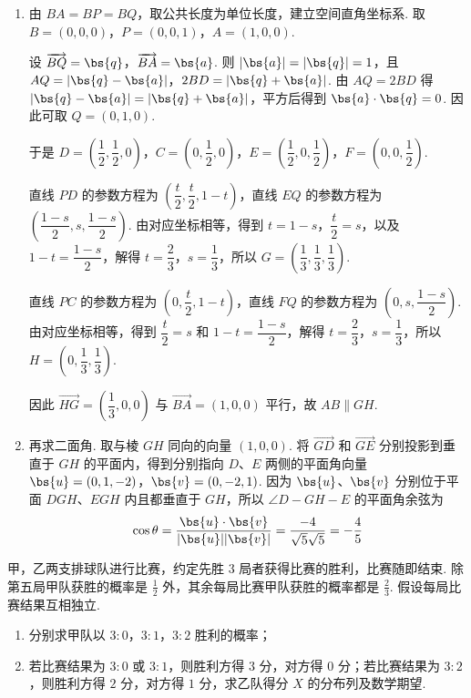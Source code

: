 \FloatBarrier

\begin{solution}
\begin{enumerate}
\item
由 \(BA=BP=BQ\)，取公共长度为单位长度，建立空间直角坐标系. 取 \(B=(0,0,0)\)，\(P=(0,0,1)\)，\(A=(1,0,0)\).

设 \(\overrightarrow{BQ}=\bs{q}\)，\(\overrightarrow{BA}=\bs{a}\). 则 \(|\bs{a}|=|\bs{q}|=1\)，且 \(AQ=|\bs{q}-\bs{a}|\)，\(2BD=|\bs{q}+\bs{a}|\). 由 \(AQ=2BD\) 得 \(|\bs{q}-\bs{a}|=|\bs{q}+\bs{a}|\)，平方后得到 \(\bs{a}\cdot\bs{q}=0\). 因此可取 \(Q=(0,1,0)\).

于是 \(D=\left(\dfrac12,\dfrac12,0\right)\)，\(C=\left(0,\dfrac12,0\right)\)，\(E=\left(\dfrac12,0,\dfrac12\right)\)，\(F=\left(0,0,\dfrac12\right)\).

直线 \(PD\) 的参数方程为 \(\left(\dfrac t2,\dfrac t2,1-t\right)\)，直线 \(EQ\) 的参数方程为 \(\left(\dfrac{1-s}{2},s,\dfrac{1-s}{2}\right)\). 由对应坐标相等，得到 \(t=1-s\)，\(\dfrac t2=s\)，以及 \(1-t=\dfrac{1-s}{2}\)，解得 \(t=\dfrac23\)，\(s=\dfrac13\)，所以 \(G=\left(\dfrac13,\dfrac13,\dfrac13\right)\).

直线 \(PC\) 的参数方程为 \(\left(0,\dfrac t2,1-t\right)\)，直线 \(FQ\) 的参数方程为 \(\left(0,s,\dfrac{1-s}{2}\right)\). 由对应坐标相等，得到 \(\dfrac t2=s\) 和 \(1-t=\dfrac{1-s}{2}\)，解得 \(t=\dfrac23\)，\(s=\dfrac13\)，所以 \(H=\left(0,\dfrac13,\dfrac13\right)\).

因此 \(\overrightarrow{HG}=\left(\dfrac13,0,0\right)\) 与 \(\overrightarrow{BA}=(1,0,0)\) 平行，故 \(AB\parallel GH\).

\item
再求二面角. 取与棱 \(GH\) 同向的向量 \((1,0,0)\). 将 \(\overrightarrow{GD}\) 和 \(\overrightarrow{GE}\) 分别投影到垂直于 \(GH\) 的平面内，得到分别指向 \(D\)、\(E\) 两侧的平面角向量
\(\bs{u}=(0,1,-2)\)，\(\bs{v}=(0,-2,1)\).
因为 \(\bs{u}\)、\(\bs{v}\) 分别位于平面 \(DGH\)、\(EGH\) 内且都垂直于 \(GH\)，所以 \(\angle D-GH-E\) 的平面角余弦为
\[
\cos\theta=\frac{\bs{u}\cdot\bs{v}}{|\bs{u}||\bs{v}|}
=\frac{-4}{\sqrt5\sqrt5}=-\frac45
\]
\end{enumerate}
\end{solution}

\begin{problem}
甲，乙两支排球队进行比赛，约定先胜 3 局者获得比赛的胜利，比赛随即结束. 除第五局甲队获胜的概率是 \(\frac{1}{2}\) 外，其余每局比赛甲队获胜的概率都是 \(\frac{2}{3}\). 假设每局比赛结果互相独立.
\begin{enumerate}
\item 分别求甲队以 \(3:0\)，\(3:1\)，\(3:2\) 胜利的概率；
\item 若比赛结果为 \(3:0\) 或 \(3:1\)，则胜利方得 \(3\) 分，对方得 \(0\) 分；若比赛结果为 \(3:2\)，则胜利方得 \(2\) 分，对方得 \(1\) 分，求乙队得分 \(X\) 的分布列及数学期望.
\end{enumerate}
\end{problem}

